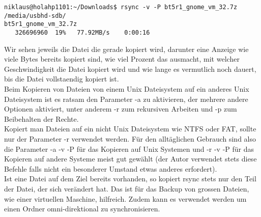 \begin{lstlisting}
niklaus@holahp1101:~/Downloads$ rsync -v -P bt5r1_gnome_vm_32.7z /media/usbhd-sdb/
bt5r1_gnome_vm_32.7z
   326696960  19%   77.92MB/s    0:00:16
\end{lstlisting}
Wir sehen jeweils die Datei die gerade kopiert wird, darunter eine Anzeige wie viele Bytes bereits kopiert sind, wie viel Prozent das ausmacht, mit welcher Geschwindigkeit die Datei kopiert wird und wie lange es vermutlich noch dauert, bis die Datei vollstaendig kopiert ist.\\
Beim Kopieren von Dateien von einem Unix Dateisystem auf ein anderes Unix Dateisystem ist es ratsam den Parameter -a zu aktivieren, der mehrere andere Optionen aktiviert, unter anderem -r zum rekursiven Arbeiten und -p zum Beibehalten der Rechte.\\
Kopiert man Dateien auf ein nicht Unix Dateisystem wie NTFS oder FAT, sollte nur der Parameter -r verwendet werden. F\"ur den allt\"aglichen Gebrauch sind also die Parameter -a -v -P f\"ur das Kopieren auf Unix Systemen und -r -v -P f\"ur das Kopieren auf andere Systeme meist gut gew\"ahlt (der Autor verwendet stets diese Befehle falls nicht ein besonderer Umstand etwas anderes erfordert).\\
Ist eine Datei auf dem Ziel bereits vorhanden, so kopiert rsync stets nur den Teil der Datei, der sich ver\"andert hat. Das ist f\"ur das Backup von grossen Dateien, wie einer virtuellen Maschine, hilfreich. Zudem kann es verwendet werden um einen Ordner omni-direktional zu synchronisieren.
